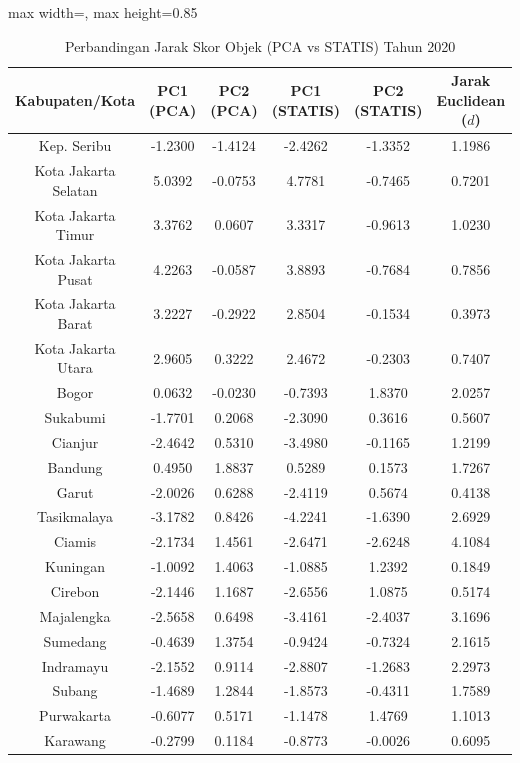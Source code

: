 \begin{table}[H]
\centering
\caption{Perbandingan Jarak Skor Objek (PCA vs STATIS) Tahun 2020} \label{tab:appjarak_skor_2020}
\begin{adjustbox}{max width=\textwidth, max height=0.85\textheight}
\begin{tabular}{|c|c|c|c|c|c|}
\hline
\textbf{Kabupaten/Kota} & \textbf{PC1 (PCA)} & \textbf{PC2 (PCA)} & \textbf{PC1 (STATIS)} & \textbf{PC2 (STATIS)} & \textbf{Jarak Euclidean ($d$)} \\
\hline
Kep. Seribu & -1.2300 & -1.4124 & -2.4262 & -1.3352 & 1.1986 \\
Kota Jakarta Selatan & 5.0392 & -0.0753 & 4.7781 & -0.7465 & 0.7201 \\
Kota Jakarta Timur & 3.3762 & 0.0607 & 3.3317 & -0.9613 & 1.0230 \\
Kota Jakarta Pusat & 4.2263 & -0.0587 & 3.8893 & -0.7684 & 0.7856 \\
Kota Jakarta Barat & 3.2227 & -0.2922 & 2.8504 & -0.1534 & 0.3973 \\
Kota Jakarta Utara & 2.9605 & 0.3222 & 2.4672 & -0.2303 & 0.7407 \\
Bogor & 0.0632 & -0.0230 & -0.7393 & 1.8370 & 2.0257 \\
Sukabumi & -1.7701 & 0.2068 & -2.3090 & 0.3616 & 0.5607 \\
Cianjur & -2.4642 & 0.5310 & -3.4980 & -0.1165 & 1.2199 \\
Bandung & 0.4950 & 1.8837 & 0.5289 & 0.1573 & 1.7267 \\
Garut & -2.0026 & 0.6288 & -2.4119 & 0.5674 & 0.4138 \\
Tasikmalaya & -3.1782 & 0.8426 & -4.2241 & -1.6390 & 2.6929 \\
Ciamis & -2.1734 & 1.4561 & -2.6471 & -2.6248 & 4.1084 \\
Kuningan & -1.0092 & 1.4063 & -1.0885 & 1.2392 & 0.1849 \\
Cirebon & -2.1446 & 1.1687 & -2.6556 & 1.0875 & 0.5174 \\
Majalengka & -2.5658 & 0.6498 & -3.4161 & -2.4037 & 3.1696 \\
Sumedang & -0.4639 & 1.3754 & -0.9424 & -0.7324 & 2.1615 \\
Indramayu & -2.1552 & 0.9114 & -2.8807 & -1.2683 & 2.2973 \\
Subang & -1.4689 & 1.2844 & -1.8573 & -0.4311 & 1.7589 \\
Purwakarta & -0.6077 & 0.5171 & -1.1478 & 1.4769 & 1.1013 \\
Karawang & -0.2799 & 0.1184 & -0.8773 & -0.0026 & 0.6095 \\

\end{tabular}
\end{adjustbox}
\end{table}
